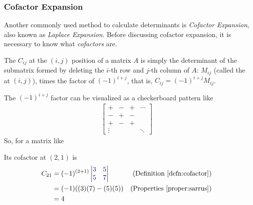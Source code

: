 \subsubsection{Cofactor Expansion}
Another commonly used method to calculate determinants is \textit{Cofactor Expansion}, also known as \textit{Laplace Expansion}. Before discussing cofactor expansion, it is necessary to know what \textit{cofactors} are.
\begin{defn}
\label{defn:cofactor}
The  $C_{ij}$ at the $(i, j)$ position of a matrix $A$ is simply the determinant of the submatrix formed by deleting the $i$-th row and $j$-th column of $A$: $M_{ij}$ (called the  at $(i, j)$), times the factor of $(-1)^{i+j}$, that is, $C_{ij} = (-1)^{i+j} M_{ij}$.
\end{defn}
The $(-1)^{i+j}$ factor can be visualized as a checkerboard pattern like
\begin{align*}
\begin{bmatrix}
+ & - & + & \cdots \\
- & + & - &  \\
+ & - & + &  \\
\vdots & &  & \ddots
\end{bmatrix}
\end{align*}
So, for a matrix like
\begin{center}
\end{center}
Its cofactor at $(2, 1)$ is
\begin{align*}
C_{21} &= (-1)^{(2+1)}
\begin{vmatrix}
\textcolor{blue}{3} & \textcolor{blue}{5} \\
\textcolor{blue}{5} & \textcolor{blue}{7}
\end{vmatrix} & \text{(Definition \ref{defn:cofactor})} \\
&= (-1)((3)(7) - (5)(5)) & \text{(Properties \ref{proper:sarrus})} \\
&= 4
\end{align*}
